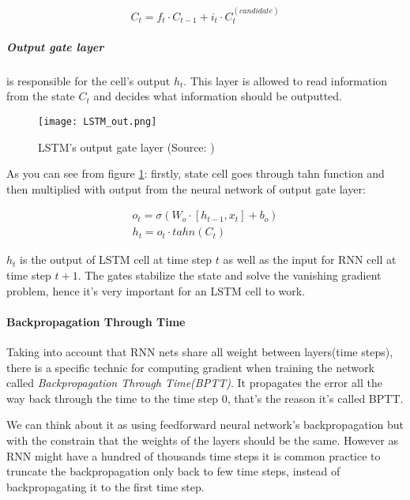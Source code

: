 \begin{equation} \label{eq:update_state}
	C_t = f_t \cdot C_{t-1} + i_t \cdot C_t^{(candidate)}
\end{equation}

\subparagraph{Output gate layer} is responsible for the cell's output $h_t$.
This layer is allowed to read information from the state $C_t$ and decides what information
should be outputted.

\begin{figure}[H]
	\texttt{[image: LSTM\_out.png]}
	\caption{
		LSTM's output gate layer (Source: \cite{ColahChristopher2015})
		}
	\label{img:lstm_out}
\end{figure}

As you can see from figure \ref{img:lstm_out}: firstly, state cell goes
through tahn function and then multiplied
with output from the neural network of output gate layer:

\begin{align} \label{eq:out_gate}
	o_t = \sigma (W_o \cdot [h_{t-1}, x_t] + b_o) \\
	h_t = o_t \cdot tahn(C_t)
\end{align}

$h_t$ is the output of LSTM cell at time step $t$ as well as the input
for RNN cell at time step $t+1$. The gates stabilize the state and solve the
vanishing gradient problem, hence it's very important for an LSTM
cell to work.\cite{Goodfellow-et-al-2016}

\paragraph{Backpropagation Through Time} Taking into account that RNN nets
share all weight between layers(time steps), there is a specific
technic for computing
gradient when training the network called \emph{Backpropagation Through Time(BPTT)}.
It propagates the error all the way back through the time to the time step 0,
that's the reason it's called BPTT. \cite{werbos:bptt}

We can think about it as using feedforward neural network's backpropagation
but with the constrain that the weights of the layers should be the same.
However as RNN might have a hundred of thousands time steps it is common
practice to truncate the backpropagation only back to few time steps, instead
of backpropagating it to the first time step.


